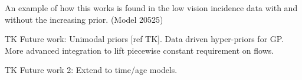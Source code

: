 An example of how this works is found in the low vision incidence data
with and without the increasing prior. (Model 20525)

TK Future work: Unimodal priors [ref TK].  Data driven hyper-priors
for GP.  More advanced integration to lift piecewise constant
requirement on flows.

TK Future work 2: Extend to time/age models.

